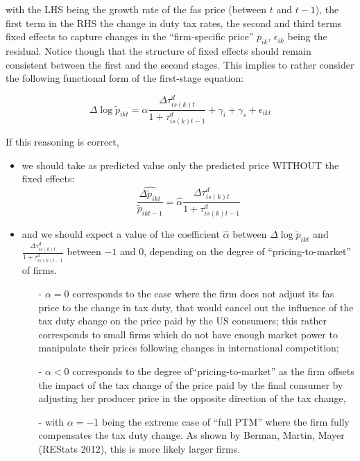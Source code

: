 \documentclass[11pt,twoside, authoryear]{elsarticle}
\begin{document}
\noindent with the LHS being the growth rate of the fas price (between $t$ and $t-1$), the first term in the RHS the change in duty tax rates, the second and third terms fixed effects to capture changes in the ``firm-specific price'' $\bar{p}_{ik}$, $\epsilon_{ik}$ being the residual. Notice though that the structure of fixed effects should remain consistent between the first and the second stages. This implies to rather consider the following functional form of the first-stage equation:

\begin{equation}
\Delta \log \widetilde{p}_{ikt} = \alpha\frac{\Delta \tau^d_{is(k)t}}{1+\tau_{is(k)t-1}^d} +\gamma_{i} +\gamma_{s}+\epsilon_{ikt} \label{eq:firststage_Deltalog}
\end{equation}

If this reasoning is correct,
\begin{itemize}
\item we should take as predicted value only the predicted price WITHOUT the fixed effects:
$$\widehat{\frac{\Delta \widetilde{p}_{ikt}}{\widetilde{p}_{ikt-1}}} = \widehat{\alpha}\frac{\Delta \tau^d_{is(k)t}}{1+\tau_{is(k)t-1}^d} $$
\item and we should expect a value of the coefficient $\widehat{\alpha}$ between $\Delta \log \widetilde{p}_{ikt}$ and $\frac{\Delta \tau^d_{is(k)t}}{1+\tau_{is(k)t-1}^d} $ between $-1$ and $0$, depending on the degree of ``pricing-to-market'' of firms.
    \begin{itemize}
    \item[-] $\alpha = 0$ corresponds to the case where the firm does not adjust its fas price to the change in tax duty, that would cancel out the influence of the tax duty change on the price paid by the US consumers; this rather corresponds to small firms which do not have enough market power to manipulate their prices following changes in international competition;
    \item[-] $\alpha <0$ corresponds to the degree of``pricing-to-market'' as the firm offsets the impact of the tax change of the price paid by the final consumer by adjusting her producer price in the opposite direction of the tax change,
    \item[-] with $\alpha = -1$ being the extreme case of ``full PTM'' where the firm fully compensates the tax duty change. As shown by Berman, Martin, Mayer (REStats 2012), this is more likely larger firms.
    \end{itemize}
\end{itemize}
\end{document}
